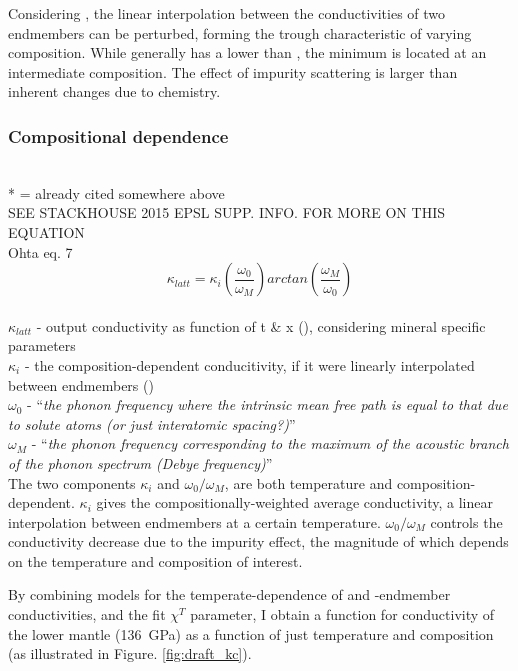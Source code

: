 Considering \citet{Ohta2017}, the linear interpolation between the conductivities of two endmembers can be perturbed, forming the trough characteristic of varying composition. While \fesios generally has a lower \tcs than \mgsio, the minimum is located at an intermediate composition. The effect of impurity scattering is larger than inherent changes due to chemistry.
    
\subsubsection{Compositional dependence}
\cite{Ohta2017}\\
* = already cited somewhere above\\

SEE STACKHOUSE 2015 EPSL SUPP. INFO. FOR MORE ON THIS EQUATION
\\
Ohta eq. 7 
\begin{equation}%
\kappa_{latt}=\kappa_{i}\left ( \frac{\omega_{0}}{\omega_{M}} \right )arctan\left ( \frac{\omega_{M}}{\omega_{0}} \right )
\label{eq.ohta7}
\end{equation}%
\\ $\kappa_{latt}$ - output conductivity as function of t \& x (\wmk), considering mineral specific parameters\\
$\kappa_{i}$ - the composition-dependent conducitivity, if it were linearly interpolated between endmembers (\wmk)\\
$\omega_{0}$ - \enquote{\textit{the phonon frequency where the intrinsic mean free path is equal to that due to solute atoms (or just interatomic spacing?)}}\\
$\omega_{M}$ - \enquote{\textit{the phonon frequency corresponding to the maximum of the acoustic branch of the phonon spectrum (Debye frequency)}}\\

The two components $\kappa_{i}$ and $\omega_{0}/\omega_{M}$, are both temperature and composition-dependent. $\kappa_{i}$ gives the compositionally-weighted average conductivity, a linear interpolation between endmembers at a certain temperature. $\omega_{0}/\omega_{M}$ controls the conductivity decrease due to the impurity effect, the magnitude of which depends on the temperature and composition of interest.

By combining models for the temperate-dependence of \mgsios and \fesio-endmember conductivities, and the fit $\chi^{T}$ parameter, I obtain a function for conductivity of the lower mantle (136~GPa) as a function of just temperature and composition (as illustrated in Figure. \ref{fig:draft_kc}).\\

